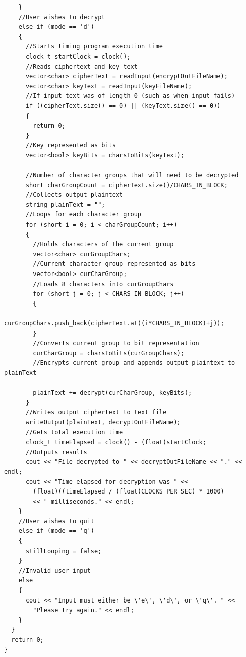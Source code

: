 \documentclass[11pt]{article}
\begin{document}
\begin{verbatim}
    }
    //User wishes to decrypt
    else if (mode == 'd')
    {
      //Starts timing program execution time
      clock_t startClock = clock();
      //Reads ciphertext and key text
      vector<char> cipherText = readInput(encryptOutFileName);
      vector<char> keyText = readInput(keyFileName);
      //If input text was of length 0 (such as when input fails)
      if ((cipherText.size() == 0) || (keyText.size() == 0))
      {
        return 0;
      }
      //Key represented as bits
      vector<bool> keyBits = charsToBits(keyText);

      //Number of character groups that will need to be decrypted
      short charGroupCount = cipherText.size()/CHARS_IN_BLOCK;
      //Collects output plaintext
      string plainText = "";
      //Loops for each character group
      for (short i = 0; i < charGroupCount; i++)
      {
        //Holds characters of the current group
        vector<char> curGroupChars;
        //Current character group represented as bits
        vector<bool> curCharGroup;
        //Loads 8 characters into curGroupChars
        for (short j = 0; j < CHARS_IN_BLOCK; j++)
        {
          curGroupChars.push_back(cipherText.at((i*CHARS_IN_BLOCK)+j));
        }
        //Converts current group to bit representation
        curCharGroup = charsToBits(curGroupChars);
        //Encrypts current group and appends output plaintext to plainText

        plainText += decrypt(curCharGroup, keyBits);
      }
      //Writes output ciphertext to text file
      writeOutput(plainText, decryptOutFileName);
      //Gets total execution time
      clock_t timeElapsed = clock() - (float)startClock;
      //Outputs results
      cout << "File decrypted to " << decryptOutFileName << "." << endl;
      cout << "Time elapsed for decryption was " <<
        (float)((timeElapsed / (float)CLOCKS_PER_SEC) * 1000)
        << " milliseconds." << endl;
    }
    //User wishes to quit
    else if (mode == 'q')
    {
      stillLooping = false;
    }
    //Invalid user input
    else
    {
      cout << "Input must either be \'e\', \'d\', or \'q\'. " <<
        "Please try again." << endl;
    }
  }
  return 0;
}
\end{verbatim}
\end{document}
